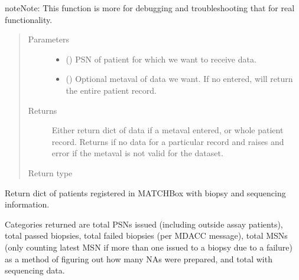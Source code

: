 \documentclass[letterpaper,10pt,english]{sphinxmanual}
\begin{document}
\begin{fulllineitems}
\begin{fulllineitems}
\begin{sphinxadmonition}{note}{Note:}
This function is more for debugging and troubleshooting that for real
functionality.
\end{sphinxadmonition}
\begin{quote}\begin{description}
\item[{Parameters}] \leavevmode\begin{itemize}
\item {} 
 () \textendash{} PSN of patient for which we want to receive data.

\item {} 
 () \textendash{} Optional metaval of data we want. If no entered, will
return the entire patient record.

\end{itemize}

\item[{Returns}] \leavevmode
Either return dict of data if a metaval entered, or whole patient
record. Returns  if no data for a particular record and raises
and error if the metaval is not valid for the dataset.

\item[{Return type}] \leavevmode
{}

\end{description}\end{quote}

\end{fulllineitems}


\begin{fulllineitems}
\label{\detokenize{matchbox_api_utils:matchbox_api_utils.match_data.MatchData.get_biopsy_summary}}
Return dict of patients registered in MATCHBox with biopsy and sequencing
information.

Categories returned are total PSNs issued (including outside
assay patients), total passed biopsies, total failed biopsies (per MDACC
message), total MSNs (only counting latest MSN if more than one issued to
a biopsy due to a failure) as a method of figuring out how many NAs were
prepared, and total with sequencing data.


\end{fulllineitems}
\end{fulllineitems}
\end{document}
